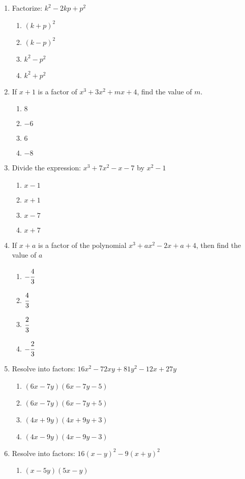 \begin{multicols}{2}
\begin{enumerate}[label={\arabic*.}]
\item Factorize: \(k^2 - 2kp + p^2\)
	\begin{enumerate}[label={\Alph*.}]
	\item \((k+p)^2\)
	\item \((k-p)^2\)
	\item \(k^2 - p^2\)
	\item \(k^2 + p^2\)
	\end{enumerate}
\item If $x+1$ is a factor of $x^3 + 3x^2 + mx + 4$, find the value of $m$. 
	\begin{enumerate}[label={\Alph*.}]
	\item \(8\)
	\item \(-6\)
	\item \(6\)
	\item \(-8\)
	\end{enumerate}
\item Divide the expression: $x^3 + 7x^2 -x - 7$ by $x^2-1$
	\begin{enumerate}[label={\Alph*.}]
	\item \(x-1\)
	\item \(x+1\)
	\item \(x-7\)
	\item \(x+7\)
	\end{enumerate}
\item If $x+a$ is a factor of the polynomial $x^3 +ax^2 -2x +a + 4$, then find the value of $a$
	\begin{enumerate}[label={\Alph*.}]
	\item \(-\cfrac{4}{3}\)
	\item \(\cfrac{4}{3}\)
	\item \(\cfrac{2}{3}\)
	\item \(-\cfrac{2}{3}\)
	\end{enumerate}
\item Resolve into factors: $16x^2 - 72xy + 81y^2 - 12x + 27y$
	\begin{enumerate}[label={\Alph*.}]
	\item \((6x -7y)(6x - 7y -5)\)
	\item \((6x -7y)(6x - 7y +5)\)
	\item \((4x + 9y)(4x + 9y + 3)\)
	\item \((4x - 9y)(4x - 9y - 3)\)
	\end{enumerate}
\item Resolve into factors: $16(x-y)^2 - 9(x+y)^2$
	\begin{enumerate}[label={\Alph*.}]
	\item \((x-5y)(5x -y)\)

\end{enumerate}
\end{enumerate}
\end{multicols}
